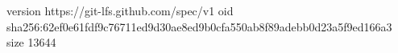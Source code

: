 version https://git-lfs.github.com/spec/v1
oid sha256:62ef0e61fdf9c76711ed9d30ae8ed9b0cfa550ab8f89adebb0d23a5f9ed166a3
size 13644
